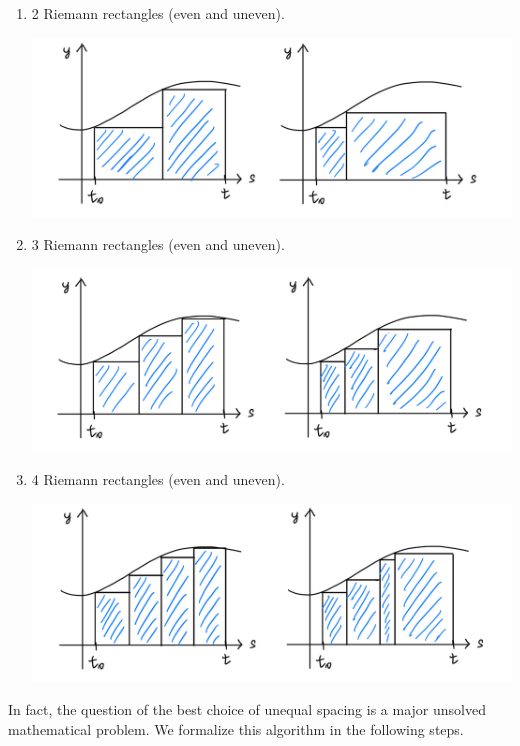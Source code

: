 \documentclass{article}
\theoremstyle{remark}
\theoremstyle{definition}
\begin{document}
    \begin{enumerate}
        \item 2 Riemann rectangles (even and uneven). 
        \begin{center}
            \includegraphics[scale=0.25]{img/2_Riemann.PNG}
        \end{center}
        \item 3 Riemann rectangles (even and uneven). 
        \begin{center}
            \includegraphics[scale=0.25]{img/3_Riemann.PNG}
        \end{center}
        \item 4 Riemann rectangles (even and uneven). 
        \begin{center}
            \includegraphics[scale=0.25]{img/4_Riemann.PNG}
        \end{center}
    \end{enumerate}
    In fact, the question of the best choice of unequal spacing is a major unsolved mathematical problem. We formalize this algorithm in the following steps. 
\end{document}
